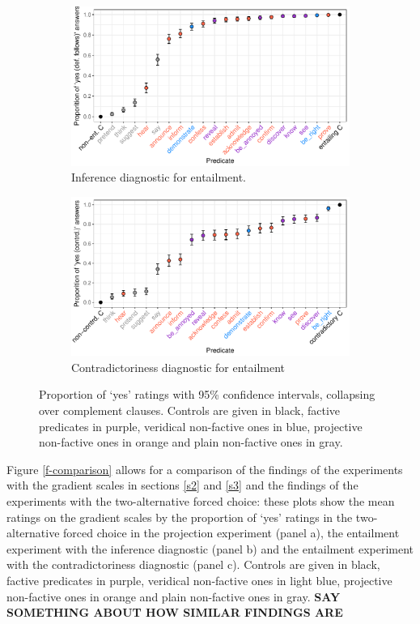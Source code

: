 \documentclass[11pt,fleqn]{article}
\newcommand{\6}{\mbox{$[\hspace*{-.6mm}[$}}
\newcommand{\9}{\mbox{$]\hspace*{-.6mm}]$}}
\begin{document}
{\begin{figure}[H]
\begin{subfigure}{1\textwidth}
\centering
\includegraphics[width=.5\paperwidth]{../results/7-veridicality3-binary/graphs/proportion-by-predicate-variability}
\caption{Inference diagnostic for entailment. }
\end{subfigure}

\begin{subfigure}{1\textwidth}
\centering
\includegraphics[width=.5\paperwidth]{../results/6-veridicality2-binary/graphs/proportion-by-predicate-variability}
\caption{Contradictoriness diagnostic for entailment}
\end{subfigure} 

\caption{Proportion of `yes' ratings with 95\% confidence intervals, collapsing over complement clauses. Controls are given in black, factive predicates in purple, veridical non-factive ones in blue, projective non-factive ones in orange and plain non-factive ones in gray.}
\label{f-binary}
\end{figure}

Figure \ref{f-comparison} allows for a comparison of the findings of the experiments with the gradient scales in sections \ref{s2} and \ref{s3} and the findings of the experiments with the two-alternative forced choice: these plots show the mean ratings on the gradient scales by the proportion of `yes' ratings in the two-alternative forced choice in the projection experiment (panel a), the entailment experiment with the inference diagnostic (panel b) and the entailment experiment with the contradictoriness diagnostic (panel c). Controls are given in black, factive predicates in purple, veridical non-factive ones in light blue, projective non-factive ones in orange and plain non-factive ones in gray. {\bf SAY SOMETHING ABOUT HOW SIMILAR FINDINGS ARE}
    
}
\end{document}
